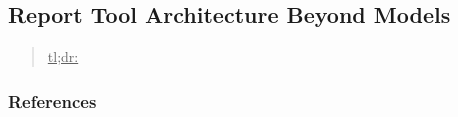 



\subsection{Report Tool Architecture Beyond Models}
\label{sec:report-tool-architecture-beyond-models}

\begin{quote}
\underline{tl;dr:} 
\end{quote}



\subsubsection{References}





